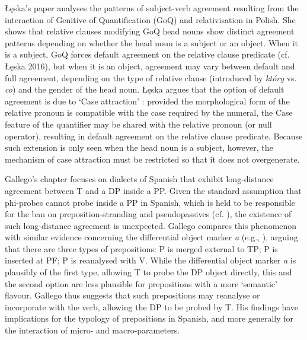 \documentclass[output=paper]{langsci/langscibook}
\begin{document}
Łęska’s paper analyses the patterns of subject-verb agreement resulting from the interaction of Genitive of Quantification (GoQ) and relativisation in Polish. She shows that relative clauses modifying GoQ head nouns show distinct agreement patterns depending on whether the head noun is a subject or an object. When it is a subject, GoQ forces default agreement on the relative clause predicate (cf. Łęska 2016), but when it is an object, agreement may vary between default and full agreement, depending on the type of relative clause (introduced by \textit{który} vs. \textit{co}) and the gender of the head noun. Łęska argues that the option of default agreement is due to ‘Case attraction’ \citep{Bader2006}: provided the morphological form of the relative pronoun is compatible with the case required by the numeral, the Case feature of the quantifier may be shared with the relative pronoun (or null operator), resulting in default agreement on the relative clause predicate. Because such extension is only seen when the head noun is a subject, however, the mechanism of case attraction must be restricted so that it does not overgenerate.

Gallego’s chapter focuses on dialects of Spanish that exhibit long-distance agreement between T and a DP inside a PP. Given the standard assumption that phi-probes cannot probe inside a PP in Spanish, which is held to be responsible for the ban on preposition-stranding and pseudopassives (cf. \citealt{Law2006}), the existence of such long-distance agreement is unexpected. Gallego compares this phenomenon with similar evidence concerning the differential object marker \textit{a} (e.g., \citealt{Torrego1998,López2012}), arguing that there are three types of prepositions: P is merged external to TP; P is inserted at PF; P is reanalysed with V. While the differential object marker \textit{a} is plausibly of the first type, allowing T to probe the DP object directly, this and the second option are less plausible for prepositions with a more ‘semantic’ flavour. Gallego thus suggests that such prepositions may reanalyse or incorporate with the verb, allowing the DP to be probed by T. His findings have implications for the typology of prepositions in Spanish, and more generally for the interaction of micro- and macro-parameters.
\end{document}
